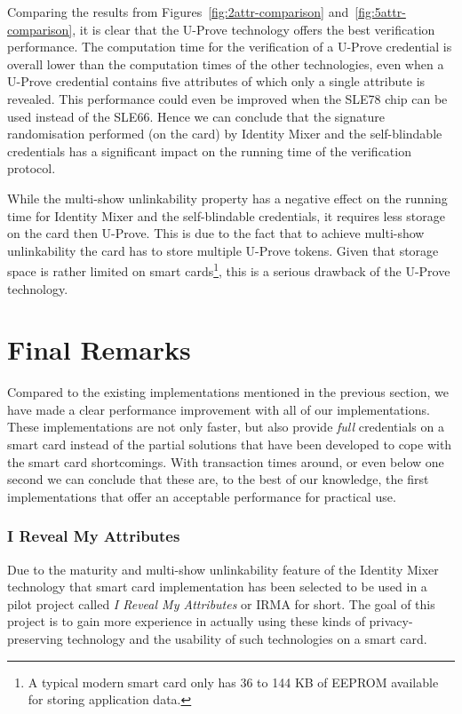 Comparing the results from Figures~\ref{fig:2attr-comparison}
and~\ref{fig:5attr-comparison}, it is clear that the U-Prove technology offers
the best verification performance. The computation time for the verification of
a U-Prove credential is overall lower than the computation times of the other
technologies, even when a U-Prove credential contains five attributes of which
only a single attribute is revealed. This performance could even be improved
when the SLE78 chip can be used instead of the SLE66. Hence we can conclude that
the signature randomisation performed (on the card) by Identity Mixer and the self-blindable
credentials has a significant impact on the running time of the verification
protocol.

While the multi-show unlinkability property has a negative effect on the running
time for Identity Mixer and the self-blindable credentials, it requires less
storage on the card then U-Prove. This is due to the fact that to achieve
multi-show unlinkability the card has to store multiple U-Prove tokens. Given
that storage space is rather limited on smart cards\footnote{A typical modern smart
card only has 36 to 144 KB of EEPROM available for storing application data.},
this is a serious drawback of the U-Prove technology.

\section{Final Remarks}

Compared to the existing implementations mentioned in the previous section, we
have made a clear performance improvement with all of our implementations. These
implementations are not only faster, but also provide \emph{full} credentials
on a smart card instead of the partial solutions that have been developed to
cope with the smart card shortcomings. With transaction times around, or even
below one second we can conclude that these are, to the best of our knowledge,
the first implementations that offer an acceptable performance for practical
use.

\subsubsection{I Reveal My Attributes}

Due to the maturity and multi-show unlinkability feature of the Identity Mixer
technology that smart card implementation has been selected to be used in a
pilot project called \emph{I Reveal My Attributes} or IRMA for short. The goal
of this project is to gain more experience in actually using these kinds of
privacy-preserving technology and the usability of such technologies on a smart
card.